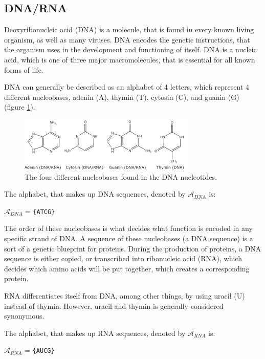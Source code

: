 \documentclass[12pt]{article}
\theoremstyle{definition}
\begin{document}
\subsection{DNA/RNA}

Deoxyribonucleic acid (DNA) is a molecule, that is found in every known living organism, as well as many viruses. DNA encodes the genetic instructions, that the organism uses in the development and functioning of itself. DNA is a nucleic acid, which is one of three major macromolecules, that is essential for all known forms of life.

DNA can generally be described as an alphabet of 4 letters, which represent 4 different nucleobases, adenin (A), thymin (T), cytosin (C), and guanin (G) (figure \ref{dnabases}).

\begin{figure}[H]
\label{dnabases}
\begin{center}
	\includegraphics[scale=4]{dnabaserne.png}
\end{center}
\caption{The four different nucleobases found in the DNA nucleotides.\cite{DNA-biotechacademy}}
\end{figure}

\begin{definition}
The alphabet, that makes up DNA sequences, denoted by $\mathcal{A}_{DNA}$ is:
\begin{center}
$\mathcal{A}_{DNA}$ = \texttt{\{ATCG\}}
\end{center}
\end{definition}

The order of these nucleobases is what decides what function is encoded in any specific strand of DNA. A sequence of these nucleobases (a DNA sequence) is a sort of a genetic blueprint for proteins. During the production of proteins, a DNA sequence is either copied, or transcribed into ribonucleic acid (RNA), which decides which amino acids will be put together, which creates a corresponding protein.

RNA differentiates itself from DNA, among other things, by using uracil (U) instead of thymin. However, uracil and thymin is generally considered synonymous.

\begin{definition}
The alphabet, that makes up RNA sequences, denoted by $\mathcal{A}_{RNA}$ is:
\begin{center}
$\mathcal{A}_{RNA}$ = \texttt{\{AUCG\}}
\end{center}
\end{definition}
\end{document}
